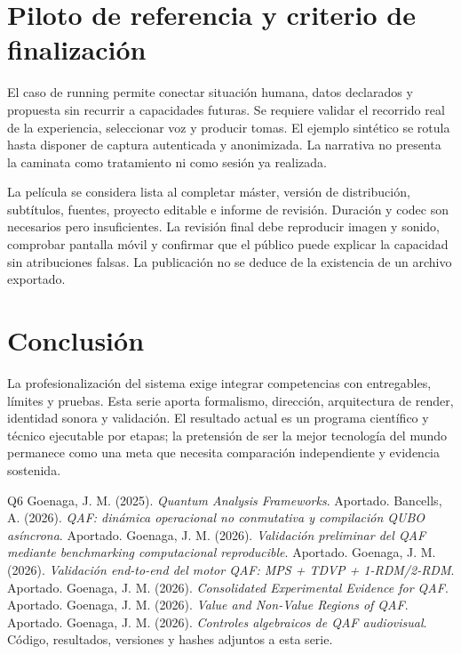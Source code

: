 \section{Piloto de referencia y criterio de finalización}
El caso de running permite conectar situación humana, datos declarados y propuesta sin recurrir a capacidades futuras. Se requiere validar el recorrido real de la experiencia, seleccionar voz y producir tomas. El ejemplo sintético se rotula hasta disponer de captura autenticada y anonimizada. La narrativa no presenta la caminata como tratamiento ni como sesión ya realizada.

La película se considera lista al completar máster, versión de distribución, subtítulos, fuentes, proyecto editable e informe de revisión. Duración y codec son necesarios pero insuficientes. La revisión final debe reproducir imagen y sonido, comprobar pantalla móvil y confirmar que el público puede explicar la capacidad sin atribuciones falsas. La publicación no se deduce de la existencia de un archivo exportado.

\section{Conclusión}
La profesionalización del sistema exige integrar competencias con entregables, límites y pruebas. Esta serie aporta formalismo, dirección, arquitectura de render, identidad sonora y validación. El resultado actual es un programa científico y técnico ejecutable por etapas; la pretensión de ser la mejor tecnología del mundo permanece como una meta que necesita comparación independiente y evidencia sostenida.

\begin{thebibliography}{Q6}
 Goenaga, J. M. (2025). \emph{Quantum Analysis Frameworks}. Aportado.
 Bancells, A. (2026). \emph{QAF: dinámica operacional no conmutativa y compilación QUBO asíncrona}. Aportado.
 Goenaga, J. M. (2026). \emph{Validación preliminar del QAF mediante benchmarking computacional reproducible}. Aportado.
 Goenaga, J. M. (2026). \emph{Validación end-to-end del motor QAF: MPS + TDVP + 1-RDM/2-RDM}. Aportado.
 Goenaga, J. M. (2026). \emph{Consolidated Experimental Evidence for QAF}. Aportado.
 Goenaga, J. M. (2026). \emph{Value and Non-Value Regions of QAF}. Aportado.
 Goenaga, J. M. (2026). \emph{Controles algebraicos de QAF audiovisual}. Código, resultados, versiones y hashes adjuntos a esta serie.
\end{thebibliography}

